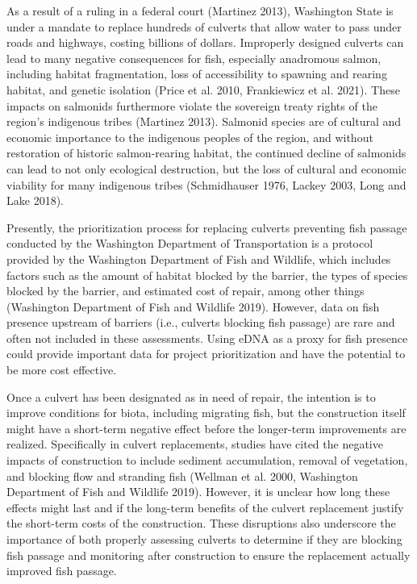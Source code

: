 \documentclass[
]{article}
\begin{document}
As a result of a ruling in a federal court (Martinez 2013), Washington
State is under a mandate to replace hundreds of culverts that allow
water to pass under roads and highways, costing billions of dollars.
Improperly designed culverts can lead to many negative consequences for
fish, especially anadromous salmon, including habitat fragmentation,
loss of accessibility to spawning and rearing habitat, and genetic
isolation (Price et al. 2010, Frankiewicz et al. 2021). These impacts on
salmonids furthermore violate the sovereign treaty rights of the
region's indigenous tribes (Martinez 2013). Salmonid species are of
cultural and economic importance to the indigenous peoples of the
region, and without restoration of historic salmon-rearing habitat, the
continued decline of salmonids can lead to not only ecological
destruction, but the loss of cultural and economic viability for many
indigenous tribes (Schmidhauser 1976, Lackey 2003, Long and Lake 2018).

Presently, the prioritization process for replacing culverts preventing
fish passage conducted by the Washington Department of Transportation is
a protocol provided by the Washington Department of Fish and Wildlife,
which includes factors such as the amount of habitat blocked by the
barrier, the types of species blocked by the barrier, and estimated cost
of repair, among other things (Washington Department of Fish and
Wildlife 2019). However, data on fish presence upstream of barriers
(i.e., culverts blocking fish passage) are rare and often not included
in these assessments. Using eDNA as a proxy for fish presence could
provide important data for project prioritization and have the potential
to be more cost effective.

Once a culvert has been designated as in need of repair, the intention
is to improve conditions for biota, including migrating fish, but the
construction itself might have a short-term negative effect before the
longer-term improvements are realized. Specifically in culvert
replacements, studies have cited the negative impacts of construction to
include sediment accumulation, removal of vegetation, and blocking flow
and stranding fish (Wellman et al. 2000, Washington Department of Fish
and Wildlife 2019). However, it is unclear how long these effects might
last and if the long-term benefits of the culvert replacement justify
the short-term costs of the construction. These disruptions also
underscore the importance of both properly assessing culverts to
determine if they are blocking fish passage and monitoring after
construction to ensure the replacement actually improved fish passage.
\end{document}
